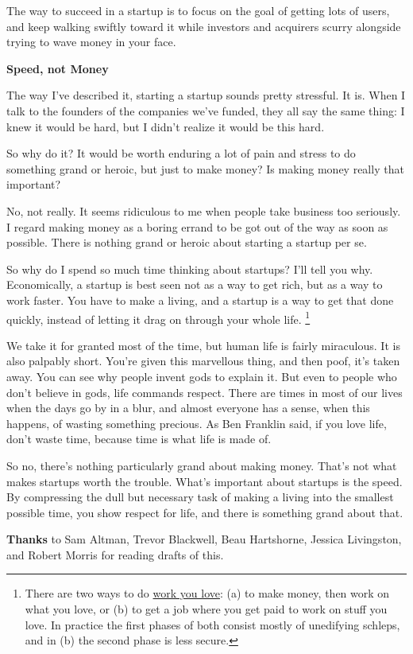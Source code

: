 \documentclass[12pt]{book}
\begin{document}
The way to succeed in a startup is to focus on the goal of getting lots
of users, and keep walking swiftly toward it while investors and
acquirers scurry alongside trying to wave money in your face.

\textbf{Speed, not Money}

The way I've described it, starting a startup sounds pretty stressful.
It is. When I talk to the founders of the companies we've funded, they
all say the same thing: I knew it would be hard, but I didn't realize it
would be this hard.

So why do it? It would be worth enduring a lot of pain and stress to do
something grand or heroic, but just to make money? Is making money
really that important?

No, not really. It seems ridiculous to me when people take business too
seriously. I regard making money as a boring errand to be got out of the
way as soon as possible. There is nothing grand or heroic about starting
a startup per se.

So why do I spend so much time thinking about startups? I'll tell you
why. Economically, a startup is best seen not as a way to get rich, but
as a way to work faster. You have to make a living, and a startup is a
way to get that done quickly, instead of letting it drag on through your
whole life. \footnote{There are two ways to do \href{love.html}{work you love}: (a) to
make money, then work on what you love, or (b) to get a job where you
get paid to work on stuff you love. In practice the first phases of both
consist mostly of unedifying schleps, and in (b) the second phase is
less secure.}

We take it for granted most of the time, but human life is fairly
miraculous. It is also palpably short. You're given this marvellous
thing, and then poof, it's taken away. You can see why people invent
gods to explain it. But even to people who don't believe in gods, life
commands respect. There are times in most of our lives when the days go
by in a blur, and almost everyone has a sense, when this happens, of
wasting something precious. As Ben Franklin said, if you love life,
don't waste time, because time is what life is made of.

So no, there's nothing particularly grand about making money. That's not
what makes startups worth the trouble. What's important about startups
is the speed. By compressing the dull but necessary task of making a
living into the smallest possible time, you show respect for life, and
there is something grand about that.


\textbf{Thanks} to Sam Altman, Trevor Blackwell, Beau Hartshorne,
Jessica Livingston, and Robert Morris for reading drafts of this.
\end{document}
